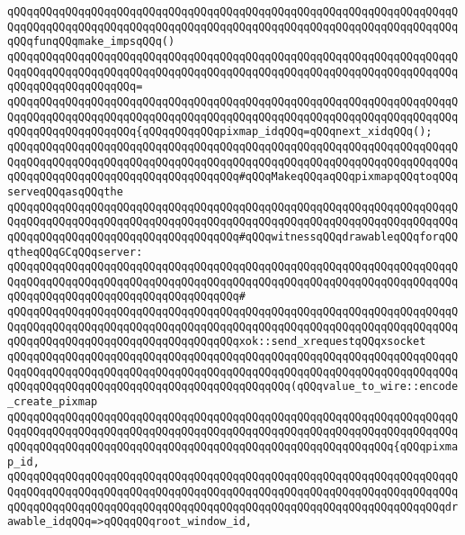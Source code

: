 \verb|qQQqqQQqqQQqqQQqqQQqqQQqqQQqqQQqqQQqqQQqqQQqqQQqqQQqqQQqqQQqqQQqqQQqqQQqqQQqqQQqqQQqqQQqqQQqqQQqqQQqqQQqqQQqqQQqqQQqqQQqqQQqqQQqqQQqqQQqqQQqqQQqfunqQQqmake_impsqQQq()|\newline
\verb|qQQqqQQqqQQqqQQqqQQqqQQqqQQqqQQqqQQqqQQqqQQqqQQqqQQqqQQqqQQqqQQqqQQqqQQqqQQqqQQqqQQqqQQqqQQqqQQqqQQqqQQqqQQqqQQqqQQqqQQqqQQqqQQqqQQqqQQqqQQqqQQqqQQqqQQqqQQqqQQq=|\newline
\verb|qQQqqQQqqQQqqQQqqQQqqQQqqQQqqQQqqQQqqQQqqQQqqQQqqQQqqQQqqQQqqQQqqQQqqQQqqQQqqQQqqQQqqQQqqQQqqQQqqQQqqQQqqQQqqQQqqQQqqQQqqQQqqQQqqQQqqQQqqQQqqQQqqQQqqQQqqQQqqQQq{qQQqqQQqqQQqpixmap_idqQQq=qQQqnext_xidqQQq();|\newline
\newline
\verb|qQQqqQQqqQQqqQQqqQQqqQQqqQQqqQQqqQQqqQQqqQQqqQQqqQQqqQQqqQQqqQQqqQQqqQQqqQQqqQQqqQQqqQQqqQQqqQQqqQQqqQQqqQQqqQQqqQQqqQQqqQQqqQQqqQQqqQQqqQQqqQQqqQQqqQQqqQQqqQQqqQQqqQQqqQQqqQQq#qQQqMakeqQQqaqQQqpixmapqQQqtoqQQqserveqQQqasqQQqthe|\newline
\verb|qQQqqQQqqQQqqQQqqQQqqQQqqQQqqQQqqQQqqQQqqQQqqQQqqQQqqQQqqQQqqQQqqQQqqQQqqQQqqQQqqQQqqQQqqQQqqQQqqQQqqQQqqQQqqQQqqQQqqQQqqQQqqQQqqQQqqQQqqQQqqQQqqQQqqQQqqQQqqQQqqQQqqQQqqQQqqQQq#qQQqwitnessqQQqdrawableqQQqforqQQqtheqQQqGCqQQqserver:|\newline
\verb|qQQqqQQqqQQqqQQqqQQqqQQqqQQqqQQqqQQqqQQqqQQqqQQqqQQqqQQqqQQqqQQqqQQqqQQqqQQqqQQqqQQqqQQqqQQqqQQqqQQqqQQqqQQqqQQqqQQqqQQqqQQqqQQqqQQqqQQqqQQqqQQqqQQqqQQqqQQqqQQqqQQqqQQqqQQqqQQq#|\newline
\verb|qQQqqQQqqQQqqQQqqQQqqQQqqQQqqQQqqQQqqQQqqQQqqQQqqQQqqQQqqQQqqQQqqQQqqQQqqQQqqQQqqQQqqQQqqQQqqQQqqQQqqQQqqQQqqQQqqQQqqQQqqQQqqQQqqQQqqQQqqQQqqQQqqQQqqQQqqQQqqQQqqQQqqQQqqQQqqQQqxok::send_xrequestqQQqxsocket|\newline
\verb|qQQqqQQqqQQqqQQqqQQqqQQqqQQqqQQqqQQqqQQqqQQqqQQqqQQqqQQqqQQqqQQqqQQqqQQqqQQqqQQqqQQqqQQqqQQqqQQqqQQqqQQqqQQqqQQqqQQqqQQqqQQqqQQqqQQqqQQqqQQqqQQqqQQqqQQqqQQqqQQqqQQqqQQqqQQqqQQqqQQqqQQq(qQQqvalue_to_wire::encode_create_pixmap|\newline
\verb|qQQqqQQqqQQqqQQqqQQqqQQqqQQqqQQqqQQqqQQqqQQqqQQqqQQqqQQqqQQqqQQqqQQqqQQqqQQqqQQqqQQqqQQqqQQqqQQqqQQqqQQqqQQqqQQqqQQqqQQqqQQqqQQqqQQqqQQqqQQqqQQqqQQqqQQqqQQqqQQqqQQqqQQqqQQqqQQqqQQqqQQqqQQqqQQqqQQqqQQq{qQQqpixmap_id,|\newline
\verb|qQQqqQQqqQQqqQQqqQQqqQQqqQQqqQQqqQQqqQQqqQQqqQQqqQQqqQQqqQQqqQQqqQQqqQQqqQQqqQQqqQQqqQQqqQQqqQQqqQQqqQQqqQQqqQQqqQQqqQQqqQQqqQQqqQQqqQQqqQQqqQQqqQQqqQQqqQQqqQQqqQQqqQQqqQQqqQQqqQQqqQQqqQQqqQQqqQQqqQQqqQQqqQQqdrawable_idqQQq=>qQQqqQQqroot_window_id,|\newline

